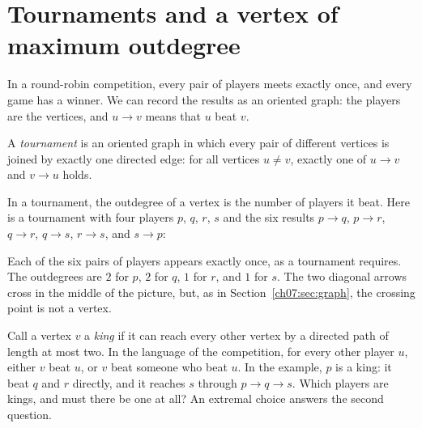 \section{Tournaments and a vertex of maximum outdegree}\label{ch07:sec:tournament}
In a round-robin competition, every pair of players meets exactly once, and every game has a winner. We can record the results as an oriented graph: the players are the vertices, and $u\to v$ means that $u$ beat $v$.

\par\noindent\begin{minipage}{\linewidth}
\begin{definition}[Tournament]\label{ch07:def:tournament}
A \emph{tournament} is an oriented graph in which every pair of different vertices is joined by exactly one directed edge: for all vertices $u\ne v$, exactly one of $u\to v$ and $v\to u$ holds.
\end{definition}
\end{minipage}\par

In a tournament, the outdegree of a vertex is the number of players it beat. Here is a tournament with four players $p$, $q$, $r$, $s$ and the six results $p\to q$, $p\to r$, $q\to r$, $q\to s$, $r\to s$, and $s\to p$:
\begin{center}
\end{center}
Each of the six pairs of players appears exactly once, as a tournament requires. The outdegrees are $2$ for $p$, $2$ for $q$, $1$ for $r$, and $1$ for $s$. The two diagonal arrows cross in the middle of the picture, but, as in Section~\ref{ch07:sec:graph}, the crossing point is not a vertex.

Call a vertex $v$ a \emph{king} if it can reach every other vertex by a directed path of length at most two. In the language of the competition, for every other player $u$, either $v$ beat $u$, or $v$ beat someone who beat $u$. In the example, $p$ is a king: it beat $q$ and $r$ directly, and it reaches $s$ through $p\to q\to s$. Which players are kings, and must there be one at all? An extremal choice answers the second question.

